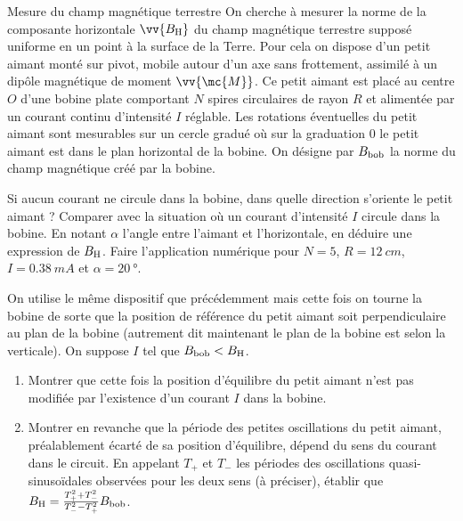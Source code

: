 	\begin{exo}[PC][2][TD]{Mesure du champ magnétique terrestre}
	On cherche à mesurer la norme de la composante horizontale $\vv{B_{\rm{H}}}$ du champ magnétique terrestre supposé uniforme en un point à la surface de la Terre. Pour cela on dispose d'un petit aimant monté sur pivot, mobile autour d'un axe sans frottement, assimilé à un dipôle magnétique de moment $\vv{\mc{M}}$. Ce petit aimant est placé au centre $O$ d'une bobine plate comportant $N$ spires circulaires de rayon $R$ et alimentée par un courant continu d'intensité $I$ réglable. Les rotations éventuelles du petit aimant sont mesurables sur un cercle gradué où sur la graduation $0$ le petit aimant est dans le plan horizontal de la bobine. On désigne par $B_{\rm{bob}}$ la norme du champ magnétique créé par la bobine.
	\begin{quest}
	\item Si aucun courant ne circule dans la bobine, dans quelle direction s'oriente le petit aimant ? Comparer avec la situation où un courant d'intensité $I$ circule dans la bobine. En notant $\alpha$ l'angle entre l'aimant et l'horizontale, en déduire une expression de $B_{\rm{H}}$. Faire l'application numérique pour $N=5$, $R=\SI{12}{cm}$, $I=\SI{0,38}{mA}$ et $\alpha=\SI{20}{\degree}$.
	\item On utilise le même dispositif que précédemment mais cette fois on tourne la bobine de sorte que la position de référence du petit aimant soit perpendiculaire au plan de la bobine (autrement dit maintenant le plan de la bobine est selon la verticale). On suppose $I$ tel que $B_{\rm{bob}}<B_{\rm{H}}$.
	\begin{enumerate}
	\item Montrer que cette fois la position d'équilibre du petit aimant n'est pas modifiée par l'existence d'un courant $I$ dans la bobine.
	\item Montrer en revanche que la période des petites oscillations du petit aimant, préalablement écarté de sa position d'équilibre, dépend du sens du courant dans le circuit. En appelant $T_+$ et $T_-$ les périodes des oscillations quasi-sinusoïdales observées pour les deux sens (à préciser), établir que $B_{\rm{H}}=\frac{T_+^2+T_-^2}{T_-^2-T_+^2}B_{\rm{bob}}$.
	\end{enumerate}
	\end{quest}
	\end{exo}
	
